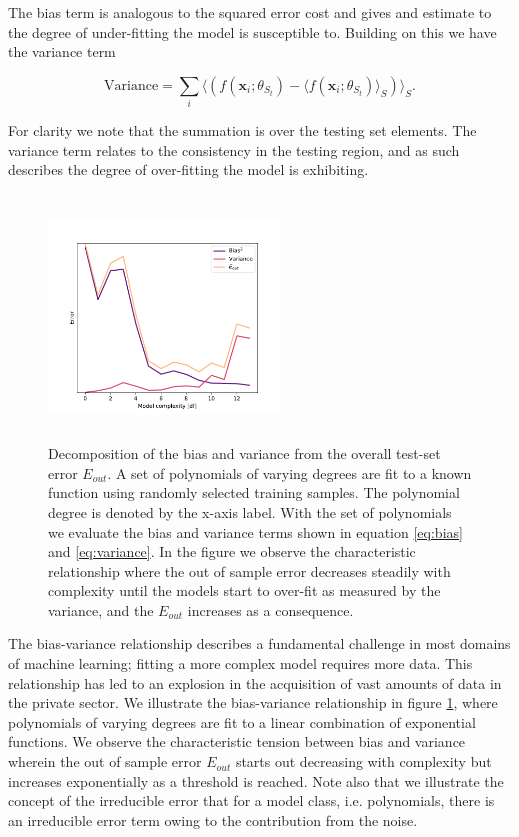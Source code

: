 \noindent The bias term is analogous to the squared error cost and gives and estimate to the degree of under-fitting the model is susceptible to. Building on this we have the variance term 

\begin{equation}\label{eq:variance}
\text{Variance} = \sum_i \langle (f(\boldsymbol{x}_i; \theta_{S_t}) - \langle f(\boldsymbol{x}_i; \theta_{S_t}) \rangle_S)\rangle_S.
\end{equation}

\noindent For clarity we note that the summation is over the testing set elements. The variance term relates to the consistency in the testing region, and as such describes the degree of over-fitting the model is exhibiting.

\begin{figure}
\centering
\includegraphics[width=0.55\textwidth, height=6.5cm]{../figures/bias_var_degree.pdf}
\caption[Bias-variance decomposition ]{Decomposition of the bias and variance from the overall test-set error $E_{out}$. A set of polynomials of varying degrees are fit to a known function using randomly selected training samples. The polynomial degree is denoted by the x-axis label. With the set of polynomials we evaluate the bias and variance terms shown in equation \ref{eq:bias} and \ref{eq:variance}. In the figure we observe the characteristic relationship where the out of sample error decreases steadily with complexity until the models start to over-fit as measured by the variance, and the $E_{out}$ increases as a consequence.}\label{fig:bv}
\end{figure}

The bias-variance relationship describes a fundamental challenge in most domains of machine learning; fitting a more complex model requires more data. This relationship has led to an explosion in the acquisition of vast amounts of data in the private sector. We illustrate the bias-variance relationship in figure \ref{fig:bv}, where polynomials of varying degrees are fit to a linear combination of exponential functions. We observe the characteristic tension between bias and variance wherein the out of sample error $E_{out}$ starts out decreasing with complexity but increases exponentially as a threshold is reached. Note also that we illustrate the concept of the irreducible error that for a model class, i.e. polynomials, there is an irreducible error term owing to the contribution from the noise. 

